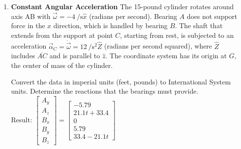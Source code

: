 \documentclass[11pt, english, a4paper, twoside]{article}
\begin{document}
\begin{enumerate}
	\item 
	\begin{minipage}[t][7cm]{0.65\textwidth}
		\textbf{Constant Angular Acceleration}
		The 15-pound cylinder rotates around axis AB with \(\vec{\omega} = -\SI{4}{\per\second} \hat{x}\) (radians per second).
		Bearing \(A\) does not support force in the \(x\) direction, which is handled by bearing \(B\).
		The shaft that extends from the support at point \(C\), starting from rest, is subjected to an acceleration \(\vec{\alpha}_C = \dot{\vec{\omega}} = \SI{12}{\per\second\squared} \hat{Z}\) (radians per second squared), where \(\hat{Z}\) includes \(\overline{AC}\) and is parallel to \(\hat{z}\).
		The coordinate system has its origin at \(G\), the center of mass of the cylinder.
		\begin{tasks}
			\task Convert the data in imperial units (feet, pounds) to International System units.
			\task Determine the reactions that the bearings must provide.\\
			Result: \(
			\left[\begin{matrix}A_{y}\\A_{z}\\B_{x}\\B_{y}\\B_{z}\end{matrix}\right] = \left[\begin{matrix}-5.79\\21.1 t + 33.4\\0\\5.79\\33.4 - 21.1 t\end{matrix}\right]
			\)
		\end{tasks}
	\end{minipage}
	\begin{minipage}[c][2cm][t]{0.3\textwidth}

\end{minipage}
\end{enumerate}
\end{document}
